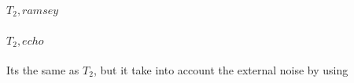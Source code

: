     \paragraph{$T_2, ramsey$}
        
    \paragraph{$T_2,echo$}
        Its the same as $T_2$, but it take into account the external noise by using 



    
        

